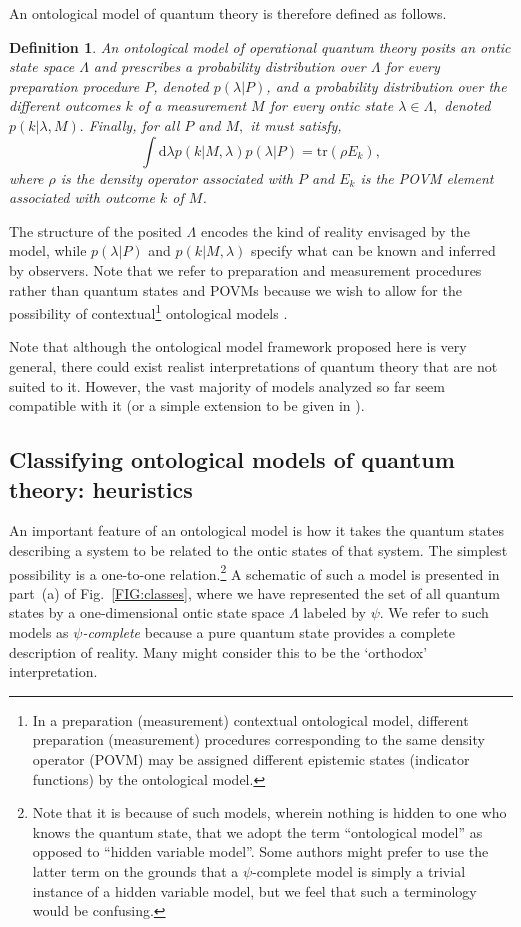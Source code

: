 \documentclass[aps,nofootinbib,12pt]{revtex4-2}
\newtheorem{definition}[theorem]{Definition}
\begin{document}
An ontological model of quantum theory is therefore defined as
follows.
\begin{definition}
An ontological model of operational quantum theory posits an ontic
state space $\Lambda$ and prescribes a probability distribution over
$\Lambda$ for every preparation procedure $P$, denoted
$p(\lambda|P)$, and a probability distribution over the different
outcomes $k$ of a measurement $M$ for every ontic state
$\lambda\in\Lambda,$ denoted\ $p(k|\lambda,M).$ Finally, for all $P$
and $M,$ it must satisfy,
\begin{equation}
\int\mathrm{d}\lambda{p}(k|M,\lambda)p(\lambda|P)=\mathrm{tr}\left(  \rho
{E}_{k}\right), \label{ont_mod_qm_stats}%
\end{equation}
where $\rho$ is the density operator associated with $P$ and $E_{k}$ is the
POVM element associated with outcome $k$ of $M$.
\end{definition}
The structure of the posited $\Lambda$ encodes the kind of reality
envisaged by the model, while $p(\lambda|P)$ and $p(k|M,\lambda)$
specify what can be known and inferred by observers. Note that we
refer to preparation and measurement procedures rather than quantum
states and POVMs because we wish to allow for the possibility of
contextual\footnote{In a preparation (measurement) contextual
ontological model, different preparation (measurement) procedures
corresponding to the same density operator (POVM) may be assigned
different epistemic states (indicator functions) by the ontological
model.} ontological models \cite{Spekkens_con}.

Note that although the ontological model framework proposed here is
very general, there could exist realist interpretations of quantum
theory that are not suited to it. However, the vast majority of
models analyzed so far seem compatible with it (or a simple
extension to be given in \cite{deficiency}).

\subsection{Classifying ontological models of quantum theory:
heuristics\label{SEC:classes_first}}

An important feature of an ontological model is how it takes the
quantum states describing a system to be related to the ontic states
of that system. The simplest possibility is a one-to-one
relation.\footnote{Note that it is because of such models, wherein
nothing is hidden to one who knows the quantum state, that we adopt
the term ``ontological model'' as opposed to ``hidden variable
model''. Some authors might prefer to use the latter term on the
grounds that a $\psi$-complete model is simply a trivial instance of
a hidden variable model, but we feel that such a terminology would
be confusing.} A schematic of such a model is presented in part~(a)
of Fig.~\ref{FIG:classes}, where we have represented the set of all
quantum states by a one-dimensional ontic state space $\Lambda$
labeled by $\psi.$ We refer to such models as $\psi$\emph{-complete}
because a pure quantum state provides a complete description of
reality. Many might consider this to be the `orthodox'
interpretation.
\end{document}

